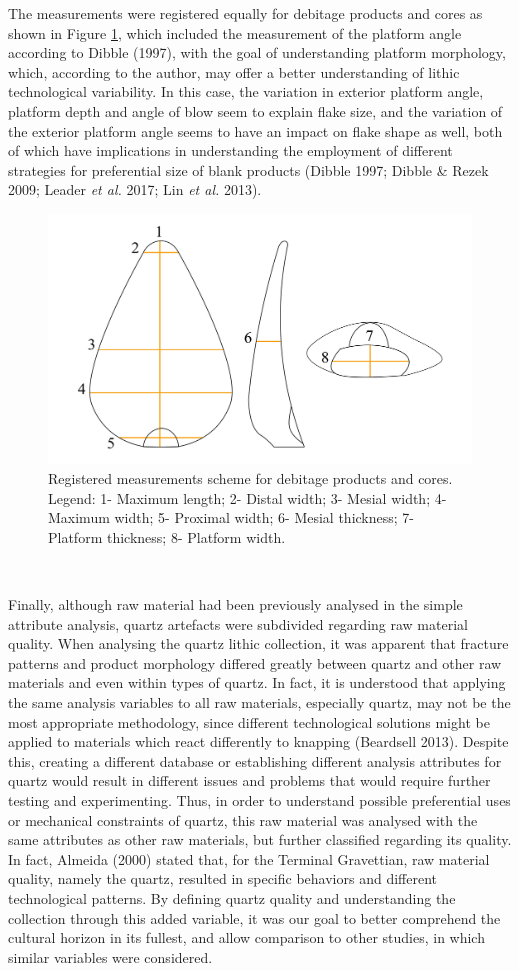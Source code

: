 \documentclass[12pt,twoside]{reedthesis}
\begin{document}
The measurements were registered equally for debitage products and cores as shown in Figure \ref{fig:metric}, which included the measurement of the platform angle according to Dibble (1997), with the goal of understanding platform morphology, which, according to the author, may offer a better understanding of lithic technological variability. In this case, the variation in exterior platform angle, platform depth and angle of blow seem to explain flake size, and the variation of the exterior platform angle seems to have an impact on flake shape as well, both of which have implications in understanding the employment of different strategies for preferential size of blank products (Dibble 1997; Dibble \& Rezek 2009; Leader \emph{et al.} 2017; Lin \emph{et al.} 2013).
\begin{figure}

{\centering \includegraphics[width=0.6\linewidth]{figure/Metrics-01} 

}

\caption{Registered measurements scheme for debitage products and cores. Legend: 1- Maximum length; 2- Distal width; 3- Mesial width; 4- Maximum width; 5- Proximal width; 6- Mesial thickness; 7- Platform thickness; 8- Platform width.}\label{fig:metric}
\end{figure}
~

Finally, although raw material had been previously analysed in the simple attribute analysis, quartz artefacts were subdivided regarding raw material quality. When analysing the quartz lithic collection, it was apparent that fracture patterns and product morphology differed greatly between quartz and other raw materials and even within types of quartz. In fact, it is understood that applying the same analysis variables to all raw materials, especially quartz, may not be the most appropriate methodology, since different technological solutions might be applied to materials which react differently to knapping (Beardsell 2013). Despite this, creating a different database or establishing different analysis attributes for quartz would result in different issues and problems that would require further testing and experimenting. Thus, in order to understand possible preferential uses or mechanical constraints of quartz, this raw material was analysed with the same attributes as other raw materials, but further classified regarding its quality. In fact, Almeida (2000) stated that, for the Terminal Gravettian, raw material quality, namely the quartz, resulted in specific behaviors and different technological patterns. By defining quartz quality and understanding the collection through this added variable, it was our goal to better comprehend the cultural horizon in its fullest, and allow comparison to other studies, in which similar variables were considered.
\end{document}

